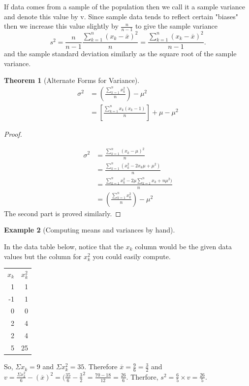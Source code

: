 \documentclass[10pt,]{book}
\theoremstyle{plain}
\newtheorem{theorem}{Theorem}[section]
\theoremstyle{definition}
\theoremstyle{definition}
\newtheorem{example}[theorem]{Example}
\theoremstyle{definition}
\numberwithin{equation}{section}
\newcommand{\hrulemedium}{\noalign{\hrule height 0.07em}}
\begin{document}
If data comes from a sample of the population then we call it a sample variance and denote this value by v. Since sample data tends to reflect certain "biases" then we increase this value slightly by \(\frac{n}{n-1}\) to give the sample variance
\begin{equation*}s^2 = \frac{n}{n-1}\frac{\sum_{k=1}^n ( x_k-\overline{x} )^2}{n} = \frac{\sum_{k=1}^n ( x_k-\overline{x} )^2}{n-1}.\end{equation*}
and the sample standard deviation similarly as the square root of the sample variance.
%
\begin{theorem}[{Alternate Forms for Variance}]\label{theorem-1}
\begin{align*}
\sigma^2 & = \left ( \frac{\sum_{k=1}^n x_k^2 }{n} \right ) - \mu^2 \\
& = \left [ \frac{\sum_{k=1}^n x_k(x_k - 1)}{n} \right ] + \mu - \mu^2
\end{align*}\end{theorem}
\begin{proof}\hypertarget{proof-1}{}

	\begin{align*}
\sigma^2 & = \frac{\sum_{k=1}^n ( x_k-\mu )^2}{n}\\
 & = \frac{\sum_{k=1}^n ( x_k^2 - 2x_k \mu + \mu^2 )}{n}\\
 & = \frac{\sum_{k=1}^n x_k^2 - 2\mu \sum_{k=1}^n x_k  + n \mu^2 )}{n}\\
 & = \left ( \frac{\sum_{k=1}^n x_k^2 }{n} \right ) - \mu^2
\end{align*}
The second part is proved similarly.	
%
\end{proof}
\begin{example}[Computing means and variances by hand]\label{example-7}

In the data table below, notice that the \(x_k\) column would be the given data values but the column for \(x_k^2\) you could easily compute.

\leavevmode%
\begin{table}
\centering
\begin{tabular}{rr}
\(x_k\)&\(x_k^2\)\tabularnewline\hrulemedium
1&1\tabularnewline[0pt]
-1&1\tabularnewline[0pt]
0&0\tabularnewline[0pt]
2&4\tabularnewline[0pt]
2&4\tabularnewline[0pt]
5&25
\end{tabular}
\end{table}

So, \(\Sigma x_k = 9\) and \(\Sigma x_k^2 = 35\).  Therefore \(\overline{x} = \frac{9}{6} = \frac{3}{2}\) and \(v = \frac{\Sigma x_k^2}{6} - (\overline{x})^2 = ( \frac{35}{6} - \frac{3}{2}^2 = \frac{70-18}{12} = \frac{26}{6}\).  Therfore, \(s^2 = \frac{6}{5} \times v = \frac{26}{5}\).
%
\end{example}
\par
\end{document}
